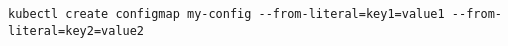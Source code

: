 \begin{verbatim}
kubectl create configmap my-config --from-literal=key1=value1 --from-literal=key2=value2
\end{verbatim}